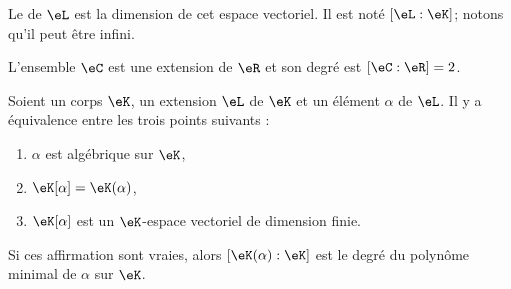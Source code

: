 \begin{definition}      \label{DefUYiyieu}
    Le  de \( \eL\) est la dimension de cet espace vectoriel. Il est noté \( [\eL:\eK]\); notons qu'il peut être infini.
\end{definition}

\begin{example}
    L'ensemble \( \eC\) est une extension de \( \eR\) et son degré est \( [\eC:\eR]=2\).
\end{example}

\begin{proposition}
    Soient un corps \( \eK\), un extension \( \eL\) de \( \eK\) et un élément \( \alpha\) de \( \eL\). Il y a équivalence entre les trois points suivants :
    \begin{enumerate}
        \item   \label{ITEMooYTEBooUuEfBz}
            \( \alpha\) est algébrique sur \( \eK\),
        \item   \label{ITEMooWMQTooLnepQl}
            \( \eK[\alpha]=\eK(\alpha)\),
        \item   \label{ITEMooAQIUooMVZojp}
            \( \eK[\alpha]\) est un \( \eK\)-espace vectoriel de dimension finie.
    \end{enumerate}
    Si ces affirmation sont vraies, alors \( [\eK(\alpha):\eK]\) est le degré du polynôme minimal de \( \alpha\) sur \( \eK\).
\end{proposition}

